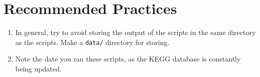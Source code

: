 \documentclass[10pt]{article}
\begin{document}
\section{Recommended Practices}
\begin{enumerate}
\item In general, try to avoid storing the output of the scripts in the same directory as the scripts.  Make a \texttt{data/} directory for storing.
\item Note the date you ran these scripts, as the KEGG database is constantly being updated.
\end{enumerate}
\end{document}
